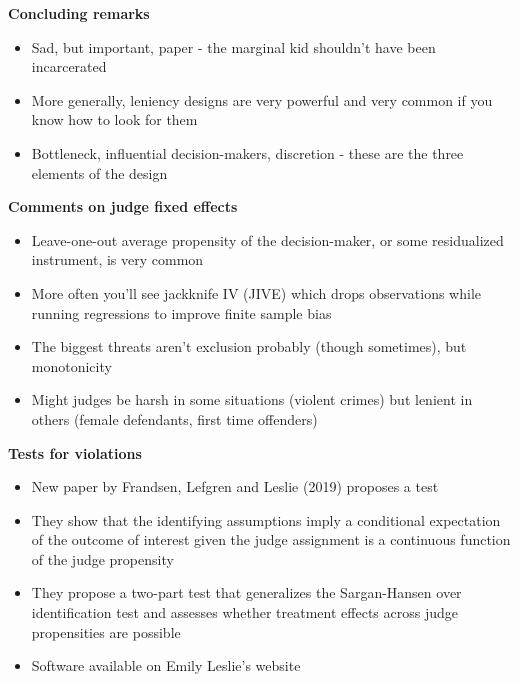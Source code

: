 \documentclass[notes=show]{beamer}
\begin{document}
\begin{frame}[plain]

\begin{center}
\textbf{Concluding remarks}
\end{center}

	\begin{itemize}
	\item Sad, but important, paper - the marginal kid shouldn't have been incarcerated
	\item More generally, leniency designs are very powerful and very common if you know how to look for them
	\item Bottleneck, influential decision-makers, discretion - these are the three elements of the design
	\end{itemize}

\end{frame}


\begin{frame}[plain]
\begin{center}
\textbf{Comments on judge fixed effects}
\end{center}

\begin{itemize}
	\item Leave-one-out average propensity of the decision-maker, or some residualized instrument, is very common
	\item More often you'll see jackknife IV (JIVE) which drops observations while running regressions to improve finite sample bias
	\item The biggest threats aren't exclusion probably (though sometimes), but monotonicity
	\item Might judges be harsh in some situations (violent crimes) but lenient in others (female defendants, first time offenders)
\end{itemize}

\end{frame}

\begin{frame}[plain]
\begin{center}
\textbf{Tests for violations}
\end{center}

\begin{itemize}
\item New paper by Frandsen, Lefgren and Leslie (2019) proposes a test 
\item They show that the identifying assumptions imply a conditional expectation of the outcome of interest given the judge assignment is a continuous function of the judge propensity 
\item They propose a two-part test that generalizes the Sargan-Hansen over identification test and assesses whether treatment effects across judge propensities are possible 
\item Software available on Emily Leslie's website
\end{itemize}

\end{frame}
\end{document}
